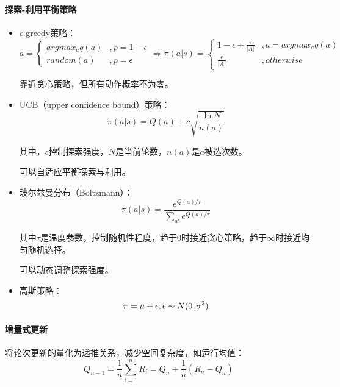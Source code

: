 \documentclass[
12pt, %
a4paper, 
oneside, %
headinclude,footinclude, %
]{scrartcl}
\begin{document}
\paragraph{探索-利用平衡策略}
\begin{itemize}
\item $ \epsilon $-greedy策略：
$$
a = 
\begin{cases} 
argmax_a q(a) &, p = 1 - \epsilon \\
random(a) &, p = \epsilon
\end{cases}
\Rightarrow 
\pi(a|s) = 
\begin{cases} 
1 - \epsilon + \frac{\epsilon}{|A|} &, a = argmax_a q(a) \\
\frac{\epsilon}{|A|} &, otherwise
\end{cases}
$$

靠近贪心策略，但所有动作概率不为零。
\item UCB（upper confidence bound）策略：
$$ \pi(a|s) = Q(a) + c\sqrt{\frac{\ln N}{n(a)}} $$

其中，$ c $控制探索强度，$ N $是当前轮数，$ n(a) $是$ a $被选次数。

可以自适应平衡探索与利用。
\item 玻尔兹曼分布（Boltzmann）：
$$ \pi(a|s) = \frac{e^{Q(a)/\tau}}{\sum_{a'} e^{Q(a)/\tau}} $$

其中$ \tau $是温度参数，控制随机性程度，趋于$ 0 $时接近贪心策略，趋于$ \infty $时接近均匀随机选择。

可以动态调整探索强度。
\item 高斯策略：
$$ \pi = \mu + \epsilon, \epsilon \thicksim N(0, \sigma^2) $$
\end{itemize}
\paragraph{增量式更新}
将轮次更新的量化为递推关系，减少空间复杂度，如运行均值：
$$ Q_{n + 1} = \frac{1}{n}\sum_{i = 1}^n R_i = Q_n + \frac{1}{n}(R_n - Q_n) $$
\end{document}
